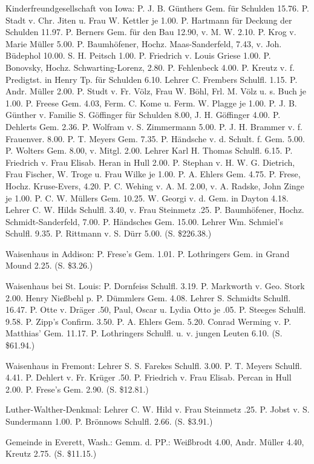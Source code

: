 Kinderfreundgesellschaft von Iowa: P. J. B. Günthers Gem. für Schulden 15.76. P. Stadt v. Chr. Jiten u. Frau W. Kettler je 1.00. P. Hartmann für Deckung der Schulden 11.97. P. Berners Gem. für den Bau 12.90, v. M. W. 2.10. P. Krog v. Marie Müller 5.00. P. Baumhöfener, Hochz. Maas-Sanderfeld, 7.43, v. Joh. Büdephol 10.00. S. H. Peitsch 1.00. P. Friedrich v. Louis Griese 1.00. P. Bonovsky, Hochz. Schwarting-Lorenz, 2.80. P. Fehlenbeck 4.00. P. Kreutz v. f. Predigtst. in Henry Tp. für Schulden 6.10. Lehrer C. Frembers Schulfl. 1.15. P. Andr. Müller 2.00. P. Studt v. Fr. Völz, Frau W. Böhl, Frl. M. Völz u. s. Buch je 1.00. P. Freese Gem. 4.03, Ferm. C. Kome u. Ferm. W. Plagge je 1.00. P. J. B. Günther v. Familie S. Göffinger für Schulden 8.00, J. H. Göffinger 4.00. P. Dehlerts Gem. 2.36. P. Wolfram v. S. Zimmermann 5.00. P. J. H. Brammer v. f. Frauenver. 8.00. P. T. Meyers Gem. 7.35. P. Händsche v. d. Schult. f. Gem. 5.00. P. Wolters Gem. 8.00, v. Mitgl. 2.00. Lehrer Karl H. Thomas Schulfl. 6.15. P. Friedrich v. Frau Elisab. Heran in Hull 2.00. P. Stephan v. H. W. G. Dietrich, Frau Fischer, W. Troge u. Frau Wilke je 1.00. P. A. Ehlers Gem. 4.75. P. Frese, Hochz. Kruse-Evers, 4.20. P. C. Wehing v. A. M. 2.00, v. A. Radske, John Zinge je 1.00. P. C. W. Müllers Gem. 10.25. W. Georgi v. d. Gem. in Dayton 4.18. Lehrer C. W. Hilds Schulfl. 3.40, v. Frau Steinmetz .25. P. Baumhöfener, Hochz. Schmidt-Sanderfeld, 7.00. P. Händsches Gem. 15.00. Lehrer Wm. Schmiel’s Schulfl. 9.35. P. Rittmann v. S. Dürr 5.00. (S. \$226.38.)

Waisenhaus in Addison: P. Frese’s Gem. 1.01. P. Lothringers Gem. in Grand Mound 2.25. (S. \$3.26.)

Waisenhaus bei St. Louis: P. Dornfeiss Schulfl. 3.19. P. Markworth v. Geo. Stork 2.00. Henry Nießbehl p. P. Dümmlers Gem. 4.08. Lehrer S. Schmidts Schulfl. 16.47. P. Otte v. Dräger .50, Paul, Oscar u. Lydia Otto je .05. P. Steeges Schulfl. 9.58. P. Zipp’s Confirm. 3.50. P. A. Ehlers Gem. 5.20. Conrad Werming v. P. Matthias’ Gem. 11.17. P. Lothringers Schulfl. u. v. jungen Leuten 6.10. (S. \$61.94.)

Waisenhaus in Fremont: Lehrer S. S. Farekes Schulfl. 3.00. P. T. Meyers Schulfl. 4.41. P. Dehlert v. Fr. Krüger .50. P. Friedrich v. Frau Elisab. Percan in Hull 2.00. P. Frese’s Gem. 2.90. (S. \$12.81.)

Luther-Walther-Denkmal: Lehrer C. W. Hild v. Frau Steinmetz .25. P. Jobst v. S. Sundermann 1.00. P. Brönnows Schulfl. 2.66. (S. \$3.91.)

Gemeinde in Everett, Wash.: Gemm. d. PP.: Weißbrodt 4.00, Andr. Müller 4.40, Kreutz 2.75. (S. \$11.15.)

